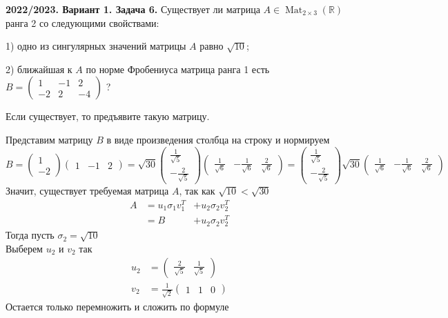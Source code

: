\documentclass[a4paper]{article}
\begin{document}
\begin{tcolorbox}[colback=blue!20!white, colframe=black!100!black]
     \textbf{2022/2023. Вариант 1. Задача 6.} Существует ли матрица $A \in \operatorname{Mat}_{2 \times 3}(\mathbb{R})$ ранга 2 со следующими свойствами:

1) одно из сингулярных значений матрицы $A$ равно $\sqrt{10}$;

2) ближайшая к $A$ по норме Фробениуса матрица ранга 1 есть $B=\left(\begin{array}{ccc}1 & -1 & 2 \\ -2 & 2 & -4\end{array}\right)$ ?

Если существует, то предъявите такую матрицу.
\end{tcolorbox}
Представим матрицу $B$ в виде произведения столбца на строку и нормируем
$$B=\begin{pmatrix}
    1\\
    -2
\end{pmatrix}\begin{pmatrix}
    1&-1&2
\end{pmatrix}=\sqrt{30}\begin{pmatrix}
    \frac{1}{\sqrt{5}}\\[1mm]
    -\frac{2}{\sqrt{5}}
\end{pmatrix}\begin{pmatrix}
    \frac{1}{\sqrt{6}}&-\frac{1}{\sqrt{6}}&\frac{2}{\sqrt{6}}
\end{pmatrix}=\begin{pmatrix}
    \frac{1}{\sqrt{5}}\\[1mm]
    -\frac{2}{\sqrt{5}}
\end{pmatrix}\sqrt{30}\begin{pmatrix}
    \frac{1}{\sqrt{6}}&-\frac{1}{\sqrt{6}}&\frac{2}{\sqrt{6}}
\end{pmatrix}$$
\indent Значит, существует требуемая матрица $A$, так как $\sqrt{10}<\sqrt{30}$\\[2mm]
$$\begin{aligned}
    A&=u_1\sigma_1 v_1^T&+u_2\sigma_2 v_2^T\\
    &=B&+u_2\sigma_2 v_2^T
    \end{aligned}$$
\indent Тогда пусть $\sigma_2=\sqrt{10}$\\[2mm]
\indent Выберем $u_2$ и $v_2$ так
$$\begin{aligned}
u_2&=\begin{pmatrix}
    \frac{2}{\sqrt{5}}&\frac{1}{\sqrt{5}}
\end{pmatrix}\\
v_2&=\frac{1}{\sqrt{2}}\begin{pmatrix}
    1&1&0
\end{pmatrix}\end{aligned}$$
\indent Остается только перемножить и сложить по формуле
\end{document}

